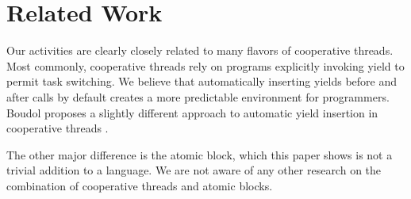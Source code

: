 \documentclass[acmsmall,anonymous,review]{acmart}\settopmatter{printfolios=true,printccs=false,printacmref=false}
\begin{document}




\section{Related Work}

Our activities are clearly closely related to many flavors of cooperative threads.
Most commonly, cooperative threads rely on programs explicitly invoking yield to permit task switching.
We believe that automatically inserting yields before and after calls by default creates a more predictable environment for programmers.
Boudol proposes a slightly different approach to automatic yield insertion in cooperative threads \cite{Boudol2007}.

The other major difference is the atomic block, which this paper shows is not a trivial addition to a language.
We are not aware of any other research on the combination of cooperative threads and atomic blocks.
\end{document}
